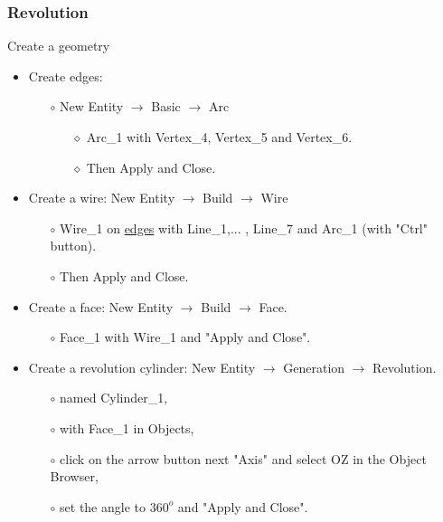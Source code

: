 \documentclass[10pt, hyperref={unicode=true,pdfusetitle, bookmarks=true,bookmarksnumbered=false,bookmarksopen=false, breaklinks=false,pdfborder={0 0 1},backref=true,colorlinks=true,linkcolor=darkblue,pageanchor}]{beamer}
\begin{document}
\begin{frame}
\frametitle{Revolution}
\begin{block}{Create a geometry}

\begin{itemize}
\item Create edges:
    \begin{itemize}
    \item [$\circ$] New Entity $\rightarrow$ Basic $\rightarrow$ Arc
        \begin{itemize}
        \item [$\diamond$] Arc\_1 with Vertex\_4, Vertex\_5 and Vertex\_6.
        \item [$\diamond$] Then Apply and Close.
        \end{itemize}
    \end{itemize}

\item Create a wire: New Entity $\rightarrow$ Build $\rightarrow$ Wire
    \begin{itemize}
    \item [$\circ$] Wire\_1 on \underline{edges} with Line\_1,... , Line\_7 and Arc\_1 (with "Ctrl" button).
    \item [$\circ$] Then Apply and Close.
    \end{itemize}

\item Create a face: New Entity $\rightarrow$ Build $\rightarrow$ Face.
    \begin{itemize}
    \item [$\circ$] Face\_1 with Wire\_1 and "Apply and Close".
    \end{itemize}

\item Create a revolution cylinder: New Entity $\rightarrow$ Generation $\rightarrow$ Revolution.
    \begin{itemize}
    \item [$\circ$] named Cylinder\_1,
    \item [$\circ$] with Face\_1 in Objects,
    \item [$\circ$] click on the arrow button next "Axis" and select OZ in the Object Browser,
    \item [$\circ$] set the angle to $360^o$ and "Apply and Close".
    \end{itemize}
\end{itemize}

\end{block}
\end{frame}
\end{document}

